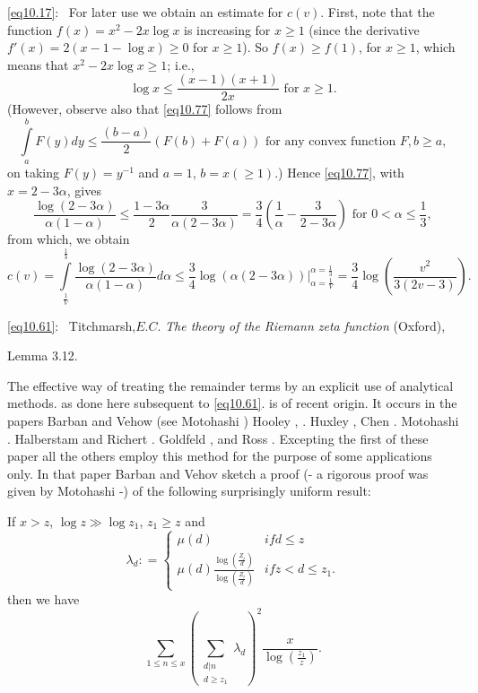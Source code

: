 \eqref{eq10.17}:~ For later use we obtain an estimate for
$c(v)$. First, note that the function $f(x)=x^2 -2x \log x$ is
increasing for $x \geq 1$ (since the derivative $f'(x) = 2(x-1-\log x)
\geq 0$ for $x \geq 1$). So $f(x) \geq f(1)$, for $x \geq 1$, which
means that $x^2 -2x \log x \geq 1$; i.e., 
\begin{equation*}
\log x \leq \frac{(x-1)(x+1)}{2x} \text{ for } x \geq
1. \tag{10.77}\label{eq10.77} 
\end{equation*}
(However, observe also that \eqref{eq10.77} follows from 
\begin{equation*}
\int\limits_{a}^{b} F(y) dy \leq \frac{(b-a)}{2} (F(b) + F(a))
\text{ for any convex function } F, b \geq a,\tag*{(10.77)$'$}
\end{equation*}
on taking $F(y)=
y^{-1}$ and $a=1$, $b=x(\geq 1)$.) Hence  \eqref{eq10.77},
  with $x = 2-3 \alpha$, gives  
\begin{equation*}
\frac{\log (2-3 \alpha)}{\alpha (1-\alpha)} \leq \frac{1-3\alpha}{2}
\frac{3}{\alpha (2-3 \alpha)}= \frac{3}{4} (\frac{1}{\alpha}-
\frac{3}{2-3 \alpha}) \text{ for } 0 < \alpha \leq
\frac{1}{3},\tag{10.78}\label{eq10.78} 
\end{equation*}
from which, we obtain
\begin{equation*}
c(v)= \int\limits_{\frac{1}{V}}^{\frac{1}{3}}\frac{\log (2-3
  \alpha)}{\alpha (1-\alpha)} d \alpha \leq \frac{3}{4} \log (\alpha
(2-3 \alpha)) |^{\alpha = \frac{1}{3}}_{\alpha = \frac{1}{V}} =
\frac{3}{4} \log (\frac{v^2}{3(2v -3)}). \tag{10.79}\label{eq10.79} 
\end{equation*}

\eqref{eq10.61}:~ Titchmarsh,\pageoriginale $E.C$. \textit{The theory
  of the Riemann zeta function} (Oxford), 

Lemma 3.12.

The effective way of treating the remainder terms by an explicit use
of analytical methods. as done here subsequent to \eqref{eq10.61}. is of
recent origin. It occurs in the papers Barban and Vehow \cite{key1} (see
Motohashi \cite{key10}) Hooley \cite{key2}, \cite{key5}. Huxley
\cite{key5}, Chen \cite{key1}. Motohashi \cite{key8}. Halberstam and
Richert \cite{key1}. Goldfeld \cite{key4}, 
and Ross \cite{key1}. Excepting the first of these paper all the others
employ this method for the purpose of some applications only. In that
paper Barban and Vehov \cite{key1} sketch a proof (- a rigorous proof was
given by Motohashi \cite{key10}-) of the following surprisingly uniform
result: 

If $x > z$, $\log z \gg \log z_1$, $z_1 \ge z$ and
\begin{equation*}
\lambda_d : =
\begin{cases}
\mu(d) & if d \le z \\
\mu(d) \frac{\log (\frac{Z_i}{d})}{\log (\frac{Z_i}{d})}& if z < d \le z_1.
\end{cases}\tag{10.80}\label{eq10.80}
\end{equation*}
then we have
\begin{equation*}
\sum_{1 \le n \le x} (\sum_{\substack{d|n \\ d \ge z_1 }} \lambda_ d)^2
\frac{x}{\log (\frac{z_1}{z})}.\tag{10.81}\label{eq10.81} 
\end{equation*}
